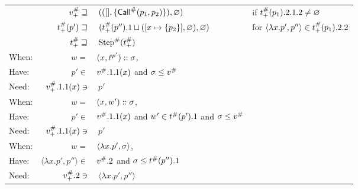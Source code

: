 \begin{center}
\begin{tabular}{|l@{\hskip2pt}r@{\hskip2pt}l@{\hskip2pt}l|}
		      & ${v}^{\#}_+\sqsupseteq$              & $\:(([],\{{\textsf{Call}}^{\#}(p_1,p_2)\}),\varnothing)$                             & if ${t}^{\#}_+(p_1).2.1.2\neq\varnothing$                  \\
		      & ${t}^{\#}_+(p')\sqsupseteq$       & $\:({t}^{\#}_+(p'').1\sqcup([x\mapsto\{p_2\}],\varnothing),\varnothing)$ & for $\langle\lambda x.p',p''\rangle\in{t}^{\#}_+(p_1).2.2$ \\
		      & ${t}^{\#}_+\sqsupseteq$           & $\:{\text{Step}}^{\#}({t}^{\#}_+)$                                                &                                                              \\
		\hline
		When: & $w=$                                & $(x,{\ell}^{p'})::\sigma$,                                          &                                                              \\
		Have: & $p'\in$                             & ${v}^{\#}.1.1(x)$ and $\sigma\le{v}^{\#}$                                      &                                                              \\
		Need: & ${v}^{\#}_+.1.1(x)\ni$               & $\:p'$                                                                     &                                                              \\
		\hline
		When: & $w=$                                & $(x,w')::\sigma$,                                                         &                                                              \\
		Have: & $p'\in$                             & ${v}^{\#}.1.1(x)$ and $w'\in{t}^{\#}(p').1$ and $\sigma\le{v}^{\#}$          &                                                              \\
		Need: & ${v}^{\#}_+.1.1(x)\ni$               & $\:p'$                                                                     &                                                              \\
		\hline
		When: & $w=$                                & $\langle\lambda x.p',\sigma\rangle$,                                         &                                                              \\
		Have: & $\langle\lambda x.p',p''\rangle\in$ & ${v}^{\#}.2$ and $\sigma\le{t}^{\#}(p'').1$                                 &                                                              \\
		Need: & ${v}^{\#}_+.2\ni$                    & $\:\langle\lambda x.p',p''\rangle$                                         &                                                              \\
		\hline
	\end{tabular}
\end{center}
